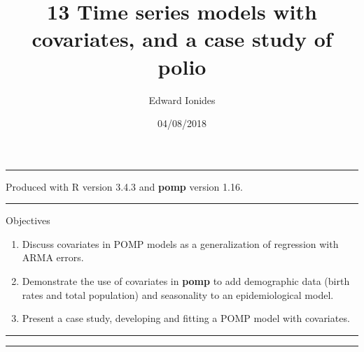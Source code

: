 \documentclass[]{article}
\title{13 Time series models with covariates, and a case study of polio}
\author{Edward Ionides}
\date{04/08/2018}
\begin{document}
\maketitle

{
\setcounter{tocdepth}{2}
\tableofcontents
}
\newcommand\prob{\mathbb{P}}
\newcommand\E{\mathbb{E}}
\newcommand\var{\mathrm{Var}}
\newcommand\cov{\mathrm{Cov}}
\newcommand\loglik{\ell}
\newcommand\R{\mathbb{R}}
\newcommand\data[1]{#1^*}
\newcommand\params{\, ; \,}
\newcommand\transpose{\scriptsize{T}}
\newcommand\eqspace{\quad\quad}
\newcommand\myeq[1]{\eqspace \displaystyle #1}
\newcommand\lik{\mathcal{L}}
\newcommand\profileloglik[1]{\ell^\mathrm{profile}_#1}
\newcommand\ar{\phi}
\newcommand\ma{\psi}
\newcommand\AR{\Phi}
\newcommand\MA{\Psi}
\newcommand\ev{u}
\newcommand\given{{\, | \,}}
\newcommand\equals{{=\,}}
\newcommand\matA{\mathbb{A}}
\newcommand\matB{\mathbb{B}}
\newcommand\matH{\mathbb{H}}
\newcommand\covmatX{\mathbb{U}}
\newcommand\covmatY{\mathbb{V}}




\begin{center}\rule{0.5\linewidth}{\linethickness}\end{center}

Produced with R version 3.4.3 and \textbf{pomp} version 1.16.

\begin{center}\rule{0.5\linewidth}{\linethickness}\end{center}

Objectives

\begin{enumerate}
\def\labelenumi{\arabic{enumi}.}
\item
  Discuss covariates in POMP models as a generalization of regression
  with ARMA errors.
\item
  Demonstrate the use of covariates in \textbf{pomp} to add demographic
  data (birth rates and total population) and seasonality to an
  epidemiological model.
\item
  Present a case study, developing and fitting a POMP model with
  covariates.
\end{enumerate}

\begin{center}\rule{0.5\linewidth}{\linethickness}\end{center}

\begin{center}\rule{0.5\linewidth}{\linethickness}\end{center}
\end{document}
